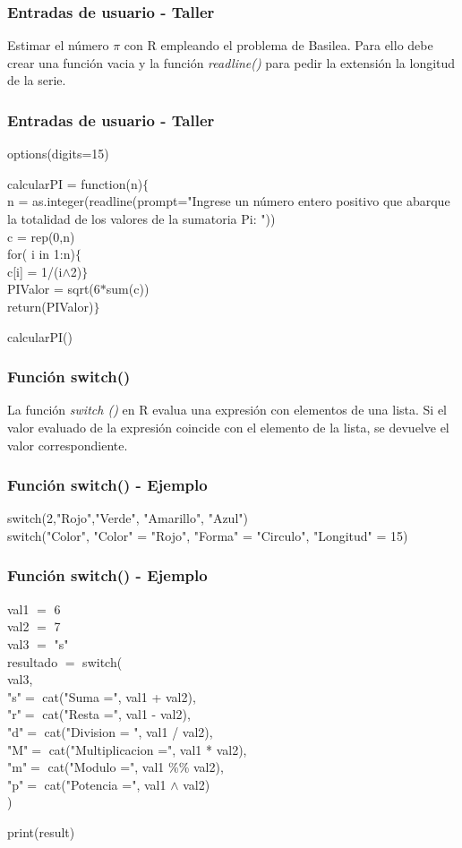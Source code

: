 \documentclass[14pt]{beamer}
\begin{document}
\begin{frame}
	\frametitle{Entradas de usuario - Taller}
	
	Estimar el número $\pi$ con R empleando el problema de Basilea. Para ello debe crear una función vacia y la función \textit{readline()} para pedir la extensión la longitud de la serie.
	
\end{frame}

\begin{frame}
	\frametitle{Entradas de usuario - Taller}
options(digits=15)\\
\vspace{0.5cm}

calcularPI = function(n)$\{$\\
	n = as.integer(readline(prompt="Ingrese un número entero positivo que abarque la totalidad de los valores de la sumatoria Pi: "))\\
	
	c = rep(0,n)\\
	for( i in 1:n)$\{$\\
		c[i] = 1/(i$\wedge$2)$\}$\\
	PIValor = sqrt(6$*$sum(c))\\
	return(PIValor)$\}$\\
\vspace{0.5cm}

calcularPI()

\end{frame}

\begin{frame}
	\frametitle{Función switch()}
	La función \textit{switch () } en R evalua una expresión con elementos de una lista. Si el valor evaluado de la expresión coincide con el elemento de la lista, se devuelve el valor correspondiente.
\end{frame}

\begin{frame}
	\frametitle{Función switch() - Ejemplo}
	switch(2,"Rojo","Verde", "Amarillo", "Azul") \\
	\vspace{0.5cm}
	switch("Color", "Color" = "Rojo", "Forma" = "Circulo", "Longitud" = 15)
\end{frame}

\begin{frame}
	\frametitle{Función switch() - Ejemplo}
	val1 $=$ 6  \\
	val2 $=$ 7 \\
	val3 $=$ "s"  \\ 
	resultado $=$ switch(  \\
	val3,  \\
	"s"$=$ cat("Suma =", val1 + val2),  \\
	"r"$=$ cat("Resta =", val1 - val2),  \\
	"d"$=$ cat("Division = ", val1 / val2),\\  
	"M"$=$ cat("Multiplicacion =", val1 * val2),\\
	"m"$=$ cat("Modulo =", val1 \%\% val2),\\
	"p"$=$ cat("Potencia =", val1 $\wedge$ val2)\\
	)  
	
	print(result) 
\end{frame}
\end{document}
